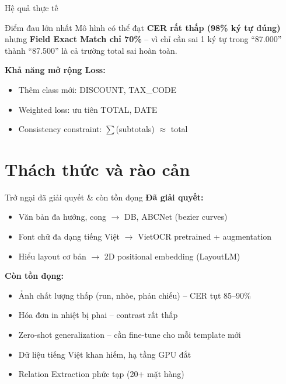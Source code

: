 \documentclass[aspectratio=169]{beamer}
\begin{document}
\begin{frame}{Hệ quả thực tế}
    \begin{alertblock}{Điểm đau lớn nhất}
        Mô hình có thể đạt \textbf{CER rất thấp (98\% ký tự đúng)} nhưng \textbf{Field Exact Match chỉ 70\%} -- vì chỉ cần sai 1 ký tự trong ``87.000'' thành ``87.500'' là cả trường total sai hoàn toàn.
    \end{alertblock}
    \vspace{0.3cm}

    \textbf{Khả năng mở rộng Loss:}
    \begin{itemize}
        \item Thêm class mới: DISCOUNT, TAX\_CODE
        \item Weighted loss: ưu tiên TOTAL, DATE
        \item Consistency constraint: $\sum$(subtotals) $\approx$ total
    \end{itemize}
\end{frame}

\section{Thách thức và rào cản}

\begin{frame}{Trở ngại đã giải quyết \& còn tồn đọng}
    \textbf{Đã giải quyết:}
    \begin{itemize}
        \item Văn bản đa hướng, cong $\rightarrow$ DB, ABCNet (bezier curves)
        \item Font chữ đa dạng tiếng Việt $\rightarrow$ VietOCR pretrained + augmentation
        \item Hiểu layout cơ bản $\rightarrow$ 2D positional embedding (LayoutLM)
    \end{itemize}
    \vspace{0.3cm}

    \textbf{Còn tồn đọng:}
    \begin{itemize}
        \item[$\times$] Ảnh chất lượng thấp (run, nhòe, phản chiếu) -- CER tụt 85--90\%
        \item[$\times$] Hóa đơn in nhiệt bị phai -- contrast rất thấp
        \item[$\times$] Zero-shot generalization -- cần fine-tune cho mỗi template mới
        \item[$\times$] Dữ liệu tiếng Việt khan hiếm, hạ tầng GPU đắt
        \item[$\times$] Relation Extraction phức tạp (20+ mặt hàng)
    \end{itemize}
\end{frame}
\end{document}
